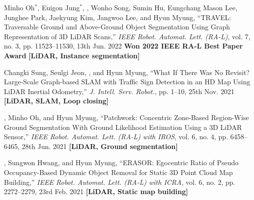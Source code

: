 \documentclass[11pt, a4paper]{../awesome-cv}
\begin{document}
\begin{cvletter}
\begin{pubSubsectionNum}
    \item Minho Oh$^*$, Euigon Jung$^*$, \hyungtaelim, Wonho Song, Sumin Hu, Eungchang Mason Lee, Junghee Park, Jaekyung Kim, Jangwoo Lee, and Hyun Myung, ``TRAVEL: Traversable Ground and Above-Ground Object Segmentation Using Graph Representation of 3D LiDAR Scans,'' \textit{IEEE Robot. Automat. Lett. (RA-L)}, vol. 7, no. 3, pp. 11523--11530, 13th Jun. 2022 \textbf{Won 2022 IEEE RA-L Best Paper Award} \textbf{[LiDAR, Instance segmentation]}
    \item Changki Sung, Seulgi Jeon, \hyungtaelim, and Hyun Myung, ``What If There Was No Revisit? Large-Scale Graph-based SLAM with Traffic Sign Detection in an HD Map Using LiDAR Inertial Odometry,'' \textit{J. Intell. Serv. Robot.}, pp. 1--10, 25th Nov. 2021 \textbf{[LiDAR, SLAM, Loop closing]}
    \item \hyungtaelim, Minho Oh, and Hyun Myung, ``Patchwork: Concentric Zone-Based Region-Wise Ground Segmentation With Ground Likelihood Estimation Using a 3D LiDAR Sensor,'' \textit{IEEE Robot. Automat. Lett. (RA-L) with IROS}, vol. 6, no. 4, pp. 6458--6465, 28th Jun. 2021 \textbf{[LiDAR, Ground segmentation]}
    \item \hyungtaelim, Sungwon Hwang, and Hyun Myung, ``ERASOR: Egocentric Ratio of Pseudo Occupancy-Based Dynamic Object Removal for Static 3D Point Cloud Map Building,'' \textit{IEEE Robot. Automat. Lett. (RA-L) with ICRA}, vol. 6, no. 2, pp. 2272--2279, 23rd Feb. 2021 \textbf{[LiDAR, Static map building]}

\end{pubSubsectionNum}

\end{cvletter}


\end{document}
